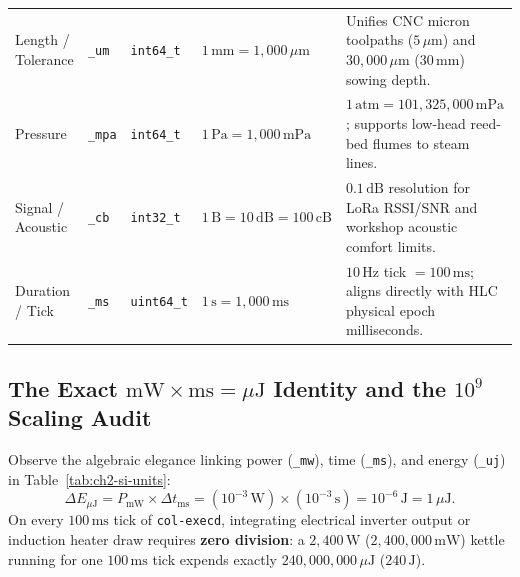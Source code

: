 \begin{table}[htbp]
\begin{tabular}{@{}llllp{5.5cm}@{}}
Length / Tolerance & \texttt{\_um} & \texttt{int64\_t} & $1\,\mathrm{mm} = 1{,}000\,\mu\mathrm{m}$ & Unifies CNC micron toolpaths ($5\,\mu\mathrm{m}$) and $30{,}000\,\mu\mathrm{m}$ ($30\,\mathrm{mm}$) sowing depth. \\
Pressure & \texttt{\_mpa} & \texttt{int64\_t} & $1\,\mathrm{Pa} = 1{,}000\,\mathrm{mPa}$ & $1\,\mathrm{atm} = 101{,}325{,}000\,\mathrm{mPa}$; supports low-head reed-bed flumes to steam lines. \\
Signal / Acoustic & \texttt{\_cb} & \texttt{int32\_t} & $1\,\mathrm{B} = 10\,\mathrm{dB} = 100\,\mathrm{cB}$ & $0.1\,\mathrm{dB}$ resolution for LoRa RSSI/SNR and workshop acoustic comfort limits. \\
Duration / Tick & \texttt{\_ms} & \texttt{uint64\_t} & $1\,\mathrm{s} = 1{,}000\,\mathrm{ms}$ & $10\,\mathrm{Hz}$ tick $= 100\,\mathrm{ms}$; aligns directly with HLC physical epoch milliseconds. \\
\bottomrule
\end{tabular}
\end{table}

\subsection{The Exact $\mathrm{mW} \times \mathrm{ms} = \mu\mathrm{J}$ Identity and the $10^9$ Scaling Audit}

Observe the algebraic elegance linking power (\texttt{\_mw}), time (\texttt{\_ms}), and
energy (\texttt{\_uj}) in Table~\ref{tab:ch2-si-units}:
\begin{equation}
\Delta E_{\mu\mathrm{J}} = P_{\mathrm{mW}} \times \Delta t_{\mathrm{ms}} = \left(10^{-3}\,\mathrm{W}\right) \times \left(10^{-3}\,\mathrm{s}\right) = 10^{-6}\,\mathrm{J} = 1\,\mu\mathrm{J}.
\label{eq:ch2-mw-ms-uj}
\end{equation}
On every $100\,\mathrm{ms}$ tick of \texttt{col-execd}, integrating electrical inverter
output or induction heater draw requires \textbf{zero division}: a $2{,}400\,\mathrm{W}$
($2{,}400{,}000\,\mathrm{mW}$) kettle running for one $100\,\mathrm{ms}$ tick expends
exactly $240{,}000{,}000\,\mu\mathrm{J}$ ($240\,\mathrm{J}$).

